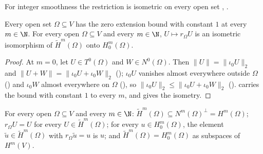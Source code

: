 For integer smoothness the restriction is isometric on every open set
\cite[Lemma 2.2(iii)]{HewettMoiola}, \cite[Lemma 3.31(vi)]{ChandlerWildeHewettMoiola}.

\begin{theorem}
\label{thm:tilde-zero-boundary-integer}
\leanok
{}
Every open set $\Omega \subseteq V$ has the zero extension bound with constant $1$ at every
$m \in \N$. For every open $\Omega \subseteq V$ and every $m \in \N$, $U \mapsto r_\Omega U$ is
an isometric isomorphism of $\tilde H^m(\Omega)$ onto $H^m_0(\Omega)$.
\end{theorem}

\begin{proof}
\leanok
At $m = 0$, let $U \in T^0(\Omega)$ and $W \in N^0(\Omega)$. Then
$\|U\| = \|\iota_0 U\|_2$ and $\|U + W\| = \|\iota_0 U + \iota_0 W\|_2$
(); $\iota_0 U$ vanishes almost everywhere outside $\Omega$
() and $\iota_0 W$ almost everywhere on $\Omega$
(), so $\|\iota_0 U\|_2 \leq \|\iota_0 U + \iota_0 W\|_2$
().  carries the bound with
constant $1$ to every $m$, and  gives the isometry.
\end{proof}

\begin{corollary}[$\tilde H^m(\Omega) = H^m_0(\Omega)$ in $H^m(V)$ for $m \in \N$]
\label{cor:tilde-zero-boundary-integer-subspace}
\leanok
{}
For every open $\Omega \subseteq V$ and every $m \in \N$:
$\tilde H^m(\Omega) \subseteq N^m(\Omega)^\perp = H^m(\Omega)$; $r_\Omega U = U$ for every
$U \in \tilde H^m(\Omega)$; for every $u \in H^m_0(\Omega)$, the element
$\tilde u \in \tilde H^m(\Omega)$ with $r_\Omega \tilde u = u$ is $u$; and
$\tilde H^m(\Omega) = H^m_0(\Omega)$ as subspaces of $H^m(V)$.
\end{corollary}

